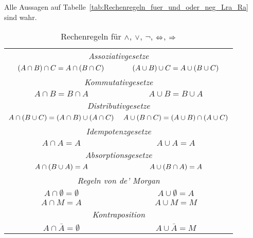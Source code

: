 \begin{theorem}
Alle Aussagen auf Tabelle~\vref{tab:Rechenregeln_fuer_und_oder_neg_Lra_Ra} sind wahr.
\begin{table}[htb]
\centering
\begin{tabular}{cc}
\toprule
\multicolumn{2}{c}{\emph{Assoziativgesetze}}\\
$\left(A \cap B\right) \cap C = A \cap \left(B \cap C\right)$ & $\left(A \cup B\right) \cup C = A \cup \left(B \cup C\right)$\\
\midrule

\multicolumn{2}{c}{\emph{Kommutativgesetze}}\\
$A \cap B = B \cap A$ & $A \cup B = B \cup A$\\
\midrule

\multicolumn{2}{c}{\emph{Distributivgesetze}}\\
$A \cap \left(B \cup C\right) = \left(A \cap B\right) \cup \left(A \cap C\right)$ & $A \cup \left(B \cap C\right) = \left(A \cup B\right) \cap \left(A \cup C\right)$\\
\midrule

\multicolumn{2}{c}{\emph{Idempotenzgesetze}}\\
$A \cap A = A$ & $A \cup A = A$\\
\midrule

\multicolumn{2}{c}{\emph{Absorptionsgesetze}}\\
$A \cap \left(B \cup A\right) = A$ & $A \cup \left(B \cap A\right) = A$\\
\midrule

\multicolumn{2}{c}{\emph{Regeln von de' Morgan}}\\
$A \cap \emptyset = \emptyset$ & $A \cup \emptyset = A$\\
$A \cap M = A$ & $A \cup M = M$\\
\midrule

\multicolumn{2}{c}{\emph{Kontraposition}}\\
$A \cap \bar{A} = \emptyset$ & $A \cup \bar{A} = M$\\
\bottomrule
\end{tabular}
\label{tab:Rechenregeln_fuer_und_oder_neg_Lra_Ra}
\caption{Rechenregeln für $\wedge$, $\vee$, $\neg$, $\Leftrightarrow$, $\Rightarrow$}
\end{table}
\end{theorem}
